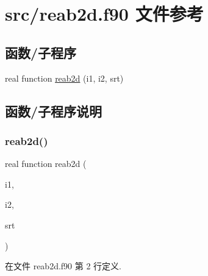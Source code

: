 \hypertarget{reab2d_8f90}{}\section{src/reab2d.f90 文件参考}
\label{reab2d_8f90}
\subsection*{函数/子程序}
\begin{DoxyCompactItemize}
\item 
real function \mbox{\hyperlink{reab2d_8f90_a89c46eb31ac52e3e82ad1c87a8c9158f}{reab2d}} (i1, i2, srt)
\end{DoxyCompactItemize}


\subsection{函数/子程序说明}
\mbox{\label{reab2d_8f90_a89c46eb31ac52e3e82ad1c87a8c9158f}} 
\subsubsection{\texorpdfstring{reab2d()}{reab2d()}}
{\footnotesize\ttfamily real function reab2d (\begin{DoxyParamCaption}\item[{}]{i1,  }\item[{}]{i2,  }\item[{}]{srt }\end{DoxyParamCaption})}



在文件 reab2d.\+f90 第 2 行定义.

